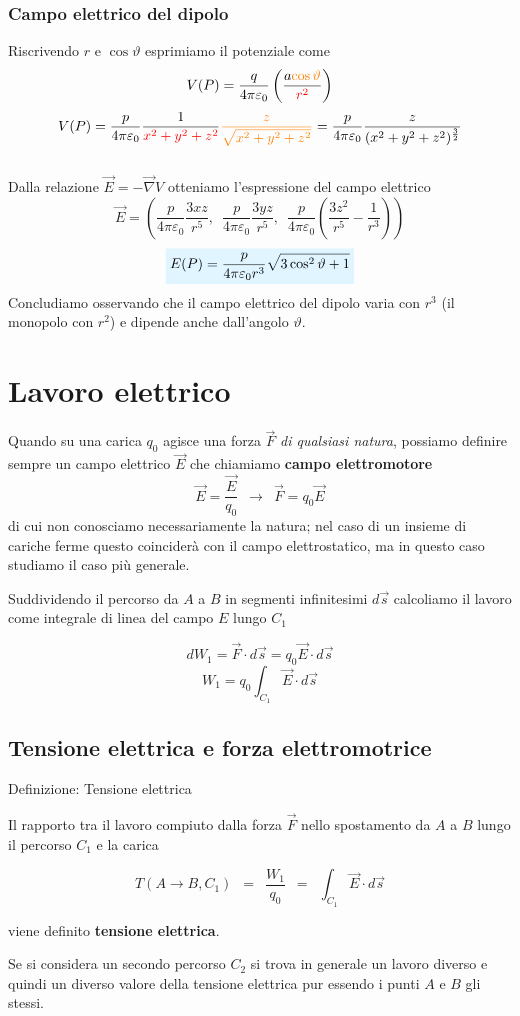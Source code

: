 \documentclass[x11names]{report}
\newcommand{\definizione}[2]{
	\begin{center}
		\fboxsep11pt
		\colorbox{myblue}{\begin{minipage}{5.75in}
				\begin{blues}{Definizione: #1}
					#2
				\end{blues}
		\end{minipage}}
	\end{center}
}
\newcommand{\viola}[1]{%
	\colorbox{myblue}{$\displaystyle #1$}
}
\begin{document}
\subsubsection{Campo elettrico del dipolo}
Riscrivendo \(r\) e \(\cos\vartheta\) esprimiamo il potenziale come
\[
V(P) = \frac{q}{4\pi \varepsilon_0} \left(\frac{a\textcolor{orange}{\cos\vartheta}}{\textcolor{red}{r^2}}\right) 
\]
\[
V(P)= \frac{p}{4\pi\varepsilon_0}\frac{1}{\textcolor{red}{x^2 + y^2 + z^2}}\textcolor{orange}{\frac{z}{\sqrt{x^2 + y^2 + z^2}}} = \frac{p}{4\pi\varepsilon_0}\frac{z}{(x^2+y^2+z^2)^{\frac{3}{2}}}
\]\\

\noindent
Dalla relazione \(\vec{E} = -\vec{\nabla}V\) otteniamo l'espressione del campo elettrico
\[
\vec{E} = \left( \frac{p}{4\pi\varepsilon_0}\frac{3xz}{r^5},\;\ \frac{p}{4\pi\varepsilon_0}\frac{3yz}{r^5},\;\ \frac{p}{4\pi\varepsilon_0}\left(\frac{3z^2}{r^5}-\frac{1}{r^3}\right)\right) 
\]
\begin{equation}
	\viola{E(P) = \frac{p}{4\pi\varepsilon_0r^3}\sqrt{3\cos^2\vartheta + 1}}
\end{equation}
Concludiamo osservando che il campo elettrico del dipolo varia con \(r^3\) (il monopolo con \(r^2\)) e dipende anche dall'angolo \(\vartheta\).


\section{Lavoro elettrico}
Quando su una carica \(q_0\) agisce una forza \(\vec{F}\) \textit{di qualsiasi natura}, possiamo definire sempre un campo elettrico \(\vec{E}\) che chiamiamo \textbf{campo elettromotore}
\[
\vec{E} = \frac{\vec{E}}{q_0} \;\ \to \;\ \vec{F} = q_0 \vec{E}
\]
di cui non conosciamo necessariamente la natura; nel caso di un insieme di cariche ferme questo coinciderà con il campo elettrostatico, ma in questo caso studiamo il caso più generale.

Suddividendo il percorso da \(A\) a \(B\) in segmenti infinitesimi \(d\vec{s}\) calcoliamo il lavoro come integrale di linea del campo \(E\) lungo \(C_1\) 

\[
dW_1 = \vec{F}\cdot d\vec{s} = q_0\vec{E} \cdot d\vec{s}
\]
\[
 W_1 =  q_0 \int_{C_1} \vec{E} \cdot d\vec{s}
\]

\subsection{Tensione elettrica e forza elettromotrice}
\definizione{Tensione elettrica}{
Il rapporto tra il lavoro compiuto dalla forza \(\vec{F}\) nello spostamento da \(A\) a \(B\) lungo il percorso \(C_1\) e la carica 


\begin{equation}
	T(A\to B,C_1) \;\ = \;\ \frac{W_1}{q_0} \;\ =\;\ \int_{C_1}\vec{E}\cdot d\vec{s}
\end{equation}

viene definito \textbf{tensione elettrica}.
}
Se si considera un secondo percorso \(C_2\) si trova in generale un lavoro diverso e quindi un diverso valore della tensione elettrica pur essendo i punti \(A\) e \(B\) gli stessi.
\end{document}
